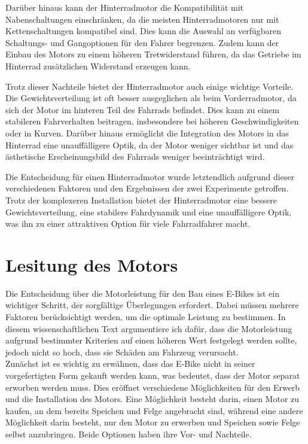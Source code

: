 Darüber hinaus kann der Hinterradmotor die Kompatibilität mit Nabenschaltungen einschränken, da die meisten Hinterradmotoren nur mit Kettenschaltungen kompatibel sind. Dies kann die Auswahl an verfügbaren Schaltungs- und Gangoptionen für den Fahrer begrenzen. Zudem kann der Einbau des Motors zu einem höheren Tretwiderstand führen, da das Getriebe im Hinterrad zusätzlichen Widerstand erzeugen kann.

Trotz dieser Nachteile bietet der Hinterradmotor auch einige wichtige Vorteile. Die Gewichtsverteilung ist oft besser ausgeglichen als beim Vorderradmotor, da sich der Motor im hinteren Teil des Fahrrads befindet. Dies kann zu einem stabileren Fahrverhalten beitragen, insbesondere bei höheren Geschwindigkeiten oder in Kurven. Darüber hinaus ermöglicht die Integration des Motors in das Hinterrad eine unauffälligere Optik, da der Motor weniger sichtbar ist und das ästhetische Erscheinungsbild des Fahrrads weniger beeinträchtigt wird.

Die Entscheidung für einen Hinterradmotor wurde letztendlich aufgrund dieser verschiedenen Faktoren und den Ergebnissen der zwei Experimente getroffen. Trotz der komplexeren Installation bietet der Hinterradmotor eine bessere Gewichtsverteilung, eine stabilere Fahrdynamik und eine unauffälligere Optik, was ihn zu einer attraktiven Option für viele Fahrradfahrer macht.

\section{Lesitung des Motors}

Die Entscheidung über die Motorleistung für den Bau eines E-Bikes ist ein wichtiger Schritt, der sorgfältige Überlegungen erfordert. Dabei müssen mehrere Faktoren berücksichtigt werden, um die optimale Leistung zu bestimmen. In diesem wissenschaftlichen Text argumentiere ich dafür, dass die Motorleistung aufgrund bestimmter Kriterien auf einen höheren Wert festgelegt werden sollte, jedoch nicht so hoch, dass sie Schäden am Fahrzeug verursacht.\\

Zunächst ist es wichtig zu erwähnen, dass das E-Bike nicht in seiner vorgefertigten Form gekauft werden kann, was bedeutet, dass der Motor separat erworben werden muss. Dies eröffnet verschiedene Möglichkeiten für den Erwerb und die Installation des Motors. Eine Möglichkeit besteht darin, einen Motor zu kaufen, an dem bereits Speichen und Felge angebracht sind, während eine andere Möglichkeit darin besteht, nur den Motor zu erwerben und Speichen sowie Felge selbst anzubringen. Beide Optionen haben ihre Vor- und Nachteile.\\

